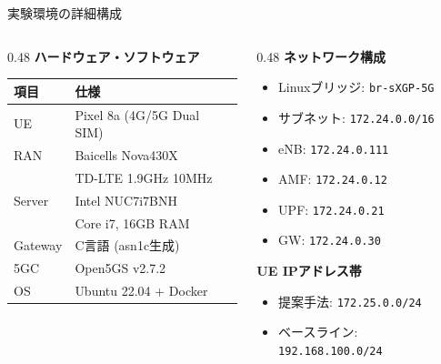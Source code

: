 \documentclass[dvipdfmx,11pt,aspectratio=169]{beamer}
\begin{document}
\begin{frame}{実験環境の詳細構成}
  \begin{columns}[T]
    \begin{column}{0.48\textwidth}
      \textbf{ハードウェア・ソフトウェア}
      \begin{table}
        \tiny
        \begin{tabular}{|l|l|}
          \hline
          \textbf{項目} & \textbf{仕様} \\
          \hline
          UE & Pixel 8a (4G/5G Dual SIM) \\
          \hline
          RAN & Baicells Nova430X \\
          & TD-LTE 1.9GHz 10MHz \\
          \hline
          Server & Intel NUC7i7BNH \\
          & Core i7, 16GB RAM \\
          \hline
          Gateway & C言語 (asn1c生成) \\
          \hline
          5GC & Open5GS v2.7.2 \\
          \hline
          OS & Ubuntu 22.04 + Docker \\
          \hline
        \end{tabular}
      \end{table}
    \end{column}
    \begin{column}{0.48\textwidth}
      \textbf{ネットワーク構成}
      \begin{itemize}
        \scriptsize
        \item Linuxブリッジ: \texttt{br-sXGP-5G}
        \item サブネット: \texttt{172.24.0.0/16}
        \item eNB: \texttt{172.24.0.111}
        \item AMF: \texttt{172.24.0.12}
        \item UPF: \texttt{172.24.0.21}
        \item GW: \texttt{172.24.0.30}
      \end{itemize}
      \vspace{0.2cm}
      \textbf{UE IPアドレス帯}
      \begin{itemize}
        \scriptsize
        \item 提案手法: \texttt{172.25.0.0/24}
        \item ベースライン: \texttt{192.168.100.0/24}
      \end{itemize}
    \end{column}
  \end{columns}
\end{frame}
\end{document}
